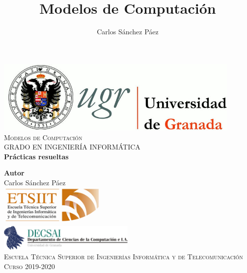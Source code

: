 \documentclass[12pt,spanish]{article}
\title{Modelos de Computación}
\author{Carlos Sánchez Páez}
\begin{document}
\lstset{columns=fullflexible,basicstyle=\ttfamily}


\begin{titlepage}

 \newlength{\centeroffset}
 \setlength{\centeroffset}{-0.5\oddsidemargin}
 \addtolength{\centeroffset}{0.5\evensidemargin}
 \thispagestyle{empty}

 \noindent\hspace*{\centeroffset}
 \begin{minipage}{\textwidth}

  \centering
  \includegraphics[width=0.9\textwidth]{logo_ugr.jpg}\\[1.4cm]

  \textsc{ \Large Modelos de Computación\\[0.2cm]}
  \textsc{GRADO EN INGENIERÍA INFORMÁTICA}\\[1cm]

  {\Huge\bfseries Prácticas resueltas\\}
 \end{minipage}

 \vspace{1.5cm}
 \noindent\hspace*{\centeroffset}
 \begin{minipage}{\textwidth}
  \centering

  \textbf{Autor}\\ {Carlos Sánchez Páez}\\[4ex]
  \includegraphics[width=0.4\textwidth]{etsiit_logo.png}\\[0.1cm]
  \vspace{1.5cm}
  \includegraphics[width=0.5\textwidth]{decsai.jpg}\\[0.1cm]
  \vspace{1cm}
  \textsc{Escuela Técnica Superior de Ingenierías Informática y de Telecomunicación}\\
  \vspace{1cm}
  \textsc{Curso 2019-2020}
 \end{minipage}
\end{titlepage}
\thispagestyle{empty}
\newpage
\tableofcontents{}
\newpage
\listoffigures
\thispagestyle{empty}
\newpage
\end{document}
